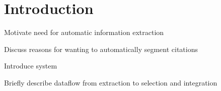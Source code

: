 \section{Introduction}

Motivate need for automatic information extraction \newline

\noindent Discuss reasons for wanting to automatically segment citations \newline

\noindent Introduce system \newline

\noindent Briefly describe dataflow from extraction to selection and integration

